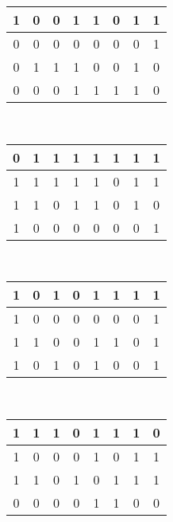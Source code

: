 \begin{tabular}{ | c | c | c | c | c | c | c | c |}
\hline
\cellcolor{blue!25}1 & 0 & 0 & 1 & 1 & 0 & 1 & 1 \\ \hline
\cellcolor{blue!25}0 & 0 & 0 & 0 & 0 & 0 & 0 & 1 \\ \hline
\cellcolor{blue!25}0 & 1 & 1 & 1 & 0 & 0 & 1 & 0 \\ \hline
\cellcolor{blue!25}0 & 0 & 0 & 1 & 1 & 1 & 1 & 0 \\ \hline
\end{tabular} \\
\begin{tabular}{ | c | c | c | c | c | c | c | c |}
\hline
0 & 1 & 1 & 1 & 1 & 1 & 1 & \cellcolor{blue!25}1 \\ \hline
1 & 1 & 1 & 1 & 1 & 0 & 1 & 1 \\ \hline
1 & 1 & 0 & 1 & 1 & 0 & 1 & 0 \\ \hline
1 & 0 & 0 & 0 & 0 & 0 & 0 & 1 \\ \hline
\end{tabular} \
\begin{tabular}{ | c | c | c | c | c | c | c | c |}
\hline
\cellcolor{blue!25}1 & \cellcolor{blue!25}0 & \cellcolor{blue!25}1 & \cellcolor{blue!25}0 & \cellcolor{blue!25}1 & \cellcolor{blue!25}1 & \cellcolor{blue!25}1 & \cellcolor{blue!25}1 \\ \hline
1 & 0 & 0 & 0 & 0 & 0 & 0 & 1 \\ \hline
1 & 1 & 0 & 0 & 1 & 1 & 0 & 1 \\ \hline
1 & 0 & 1 & 0 & 1 & 0 & 0 & 1 \\ \hline
\end{tabular} \
\begin{tabular}{ | c | c | c | c | c | c | c | c |}
\hline
\cellcolor{blue!25}1 & 1 & 1 & 0 & 1 & 1 & 1 & 0 \\ \hline
1 & 0 & 0 & 0 & 1 & 0 & 1 & 1 \\ \hline
1 & 1 & 0 & 1 & 0 & 1 & 1 & 1 \\ \hline
0 & 0 & 0 & 0 & 1 & 1 & 0 & 0 \\ \hline
\end{tabular}
